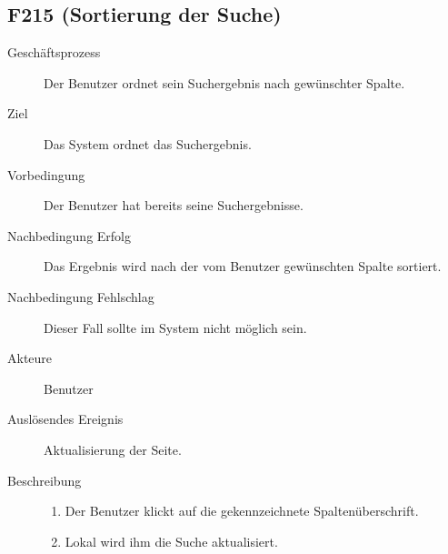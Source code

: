 \subsection{F215 (Sortierung der Suche)}
\begin{description}
  \item[Geschäftsprozess]Der Benutzer ordnet sein Suchergebnis nach gewünschter Spalte.
  \item[Ziel]Das System ordnet das Suchergebnis.
  \item[Vorbedingung]Der Benutzer hat bereits seine Suchergebnisse.
  \item[Nachbedingung Erfolg]Das Ergebnis wird nach der vom Benutzer gewünschten Spalte sortiert.
  \item[Nachbedingung Fehlschlag]Dieser Fall sollte im System nicht möglich sein.
  \item[Akteure]Benutzer
  \item[Auslösendes Ereignis]Aktualisierung der Seite.
  \item[Beschreibung]\hfill
    \begin{enumerate}
      \item Der Benutzer klickt auf die gekennzeichnete Spaltenüberschrift.
      \item Lokal wird ihm die Suche aktualisiert.
    \end{enumerate}
\end{description}

